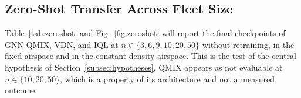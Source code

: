 \subsection{Zero-Shot Transfer Across Fleet Size}
\label{subsec:results-zeroshot}
Table~\ref{tab:zeroshot} and Fig.~\ref{fig:zeroshot} will report the final checkpoints of
GNN-QMIX, VDN, and IQL at $n\in\{3,6,9,10,20,50\}$ without retraining, in the fixed airspace
and in the constant-density airspace. This is the test of the central hypothesis of
Section~\ref{subsec:hypotheses}. QMIX appears as not evaluable at $n\in\{10,20,50\}$, which
is a property of its architecture and not a measured outcome.

